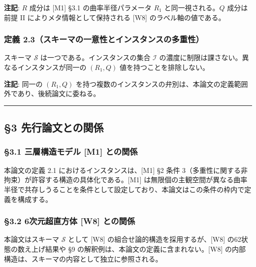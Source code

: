 \documentclass[
  a4paper,11pt]{ltjsarticle}
\theoremstyle{definition}
\theoremstyle{remark}
\begin{document}
\textbf{注記}: \(R\) 成分は {[}M1{]} §3.1 の曲率半径パラメータ \(R_1\)
と同一視される。\(Q\) 成分は前提 II によりメタ情報として保持される
{[}W8{]} のラベル軸の値である。

\subsubsection{定義
2.3（スキーマの一意性とインスタンスの多重性）}\label{ux5b9aux7fa9-2.3ux30b9ux30adux30fcux30deux306eux4e00ux610fux6027ux3068ux30a4ux30f3ux30b9ux30bfux30f3ux30b9ux306eux591aux91cdux6027}

スキーマ \(\mathcal{S}\) は一つである。インスタンスの集合
\(\mathcal{I}\) の濃度に制限は課さない。異なるインスタンスが同一の
\((R_1, Q)\) 値を持つことを排除しない。

\textbf{注記}: 同一の \((R_1, Q)\)
を持つ複数のインスタンスの弁別は、本論文の定義範囲外であり、後続論文に委ねる。

\begin{center}\rule{0.5\linewidth}{0.5pt}\end{center}

\subsection{§3
先行論文との関係}\label{ux5148ux884cux8ad6ux6587ux3068ux306eux95a2ux4fc2}

\subsubsection{§3.1 三層構造モデル {[}M1{]}
との関係}\label{ux4e09ux5c64ux69cbux9020ux30e2ux30c7ux30eb-m1-ux3068ux306eux95a2ux4fc2}

本論文の定義 2.1 におけるインスタンスは、{[}M1{]} §2 条件
3（多重性に関する非拘束）が許容する構造の具体化である。{[}M1{]}
は無限個の主観空間が異なる曲率半径で共存しうることを条件として設定しており、本論文はこの条件の枠内で定義を構成する。

\subsubsection{§3.2 6次元超直方体 {[}W8{]}
との関係}\label{ux6b21ux5143ux8d85ux76f4ux65b9ux4f53-w8-ux3068ux306eux95a2ux4fc2}

本論文はスキーマ \(\mathcal{S}\) として {[}W8{]}
の組合せ論的構造を採用するが、{[}W8{]} の62状態の数え上げ結果や §9
の解釈例は、本論文の定義に含まれない。{[}W8{]}
の内部構造は、スキーマの内容として独立に参照される。
\end{document}
